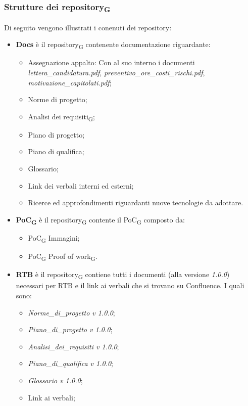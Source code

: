 \subsubsection{Strutture dei repository\textsubscript{G}}
Di seguito vengono illustrati i conenuti dei repository:
\begin{itemize}
	\item \textbf{Docs} è il repository\textsubscript{G} contenente documentazione riguardante:
	\begin{itemize}
		\item Assegnazione appalto: Con al suo interno i documenti \textit{lettera\_candidatura.pdf}, 
		\textit{preventivo\_ore\_costi\_rischi.pdf}, 
		\textit{motivazione\_capitolati.pdf};
		\item Norme di progetto;
		\item Analisi dei requisiti\textsubscript{G};
		\item Piano di progetto;
		\item Piano di qualifica;
		\item Glossario;
		\item Link dei verbali interni ed esterni;
		\item Ricerce ed approfondimenti riguardanti nuove tecnologie da adottare.
	\end{itemize}
	\item \textbf{PoC\textsubscript{G}} è il repository\textsubscript{G} contente il PoC\textsubscript{G} composto da:
	\begin{itemize}
		\item PoC\textsubscript{G} Immagini;
		\item PoC\textsubscript{G} Proof of work\textsubscript{G}.
	\end{itemize}
	\item \textbf{RTB} è il repository\textsubscript{G} contiene tutti i documenti (alla versione \textit{1.0.0}) necessari per RTB e il link ai verbali che si trovano su Confluence. I quali sono:
	\begin{itemize}
		\item \textit{Norme\_di\_progetto v 1.0.0};
		\item \textit{Piano\_di\_progetto v 1.0.0};
		\item \textit{Analisi\_dei\_requisiti v 1.0.0};
		\item \textit{Piano\_di\_qualifica v 1.0.0};
		\item \textit{Glossario v 1.0.0};
		\item Link ai verbali;
	\end{itemize}
\end{itemize}
